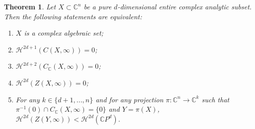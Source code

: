 \documentclass[a4paper,11pt]{amsart}
\newtheorem{theorem}{Theorem}[section]
\newcommand{\C}{\mathbb C}
\begin{document}
\begin{theorem}\label{chow-type-thm}
Let $X\subset\C^n$ be a pure $d$-dimensional entire complex analytic subset. Then the following statements are equivalent:
\begin{enumerate}
 \item $X$ is a complex algebraic set;
 \item $\mathcal{H}^{2d+1}(C(X,\infty))=0$;
 \item $\mathcal{H}^{2d+2}(C_{\mathbb{C}}(X,\infty))=0$;
 \item $\mathcal{H}^{2d}(Z(X,\infty))=0$;
 \item For any $k\in\{d+1,...,n\}$ and for any projection $\pi\colon \mathbb{C}^{n}\to \mathbb{C}^{k}$ such that $\pi^{-1}(0)\cap C_{\mathbb{C}}(X,\infty)=\{0\}$ and $Y=\pi(X)$, $\mathcal{H}^{2d}(Z(Y,\infty))<\mathcal{H}^{2d}(\mathbb{C}P^{d})$.
\end{enumerate}
\end{theorem}
\end{document}
